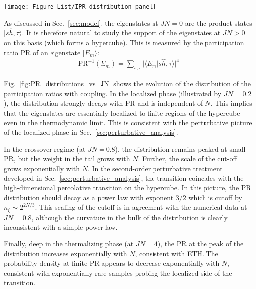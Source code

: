 \documentclass[aps,pra,twocolumn,a4paper,showpacs,superscriptaddress,floatfix,10pt]{revtex4}
\begin{document}
\begin{figure*}[!t]
\texttt{[image: Figure\_List/IPR\_distribution\_panel]}
\caption{Probability density function of the eigenstate participation ratio (PR)
on the classical basis $|s\hat h,\tau\rangle$ for $JN$ in the three different regimes:
deep in the MBL phase ($JN=0.2$), in the crossover region ($JN=0.8$), and
in the thermal phase ($JN=4.0$).
 }
\label{fig:PR_distributions_vs_JN}
\end{figure*}


As discussed in Sec.~\ref{sec:model}, the eigenstates at $JN=0$ are the product states $|s\hat{h}, \tau\rangle$.
It is therefore natural to study the support of the eigenstates at $JN>0$ on this basis (which forms a hypercube).
This is measured by the participation ratio $\textrm{PR}$ of an eigenstate $|E_m\rangle$:
\begin{align}
	\textrm{PR}^{-1}(E_m) = \sum_{s,\tau} |\langle E_m | {s\hat{h},\tau}\rangle |^4
	\label{Eq:ClassicalPR}
\end{align}

Fig.~\ref{fig:PR_distributions_vs_JN} shows the evolution of the distribution of the participation ratios with coupling.
In the localized phase (illustrated by $JN=0.2$), the distribution strongly decays with PR and is independent of $N$.
This implies that the eigenstates are essentially localized to finite regions of the hypercube even in the thermodynamic limit.
This is consistent with the perturbative picture of the localized phase in Sec.~\ref{sec:perturbative_analysis}.

In the crossover regime (at $JN=0.8$), the distribution remains peaked at small PR, but the weight in the tail grows with $N$.
Further, the scale of the cut-off grows exponentially with $N$.
In the second-order perturbative treatment developed in Sec.~\ref{sec:perturbative_analysis}, the transition coincides with the high-dimensional percolative transition on the hypercube.
In this picture, the PR distribution should decay as a power law with exponent $3/2$ which is cutoff by $n_\xi \sim 2^{2N/3}$.
This scaling of the cutoff is in agreement with the numerical data at $JN=0.8$, although the curvature in the bulk of the distribution is clearly inconsistent with a simple power law.

Finally, deep in the thermalizing phase (at $JN=4$), the PR at the peak of the distribution increases exponentially with $N$, consistent with ETH.
The probability density at finite PR appears to decrease exponentially with $N$, consistent with exponentially rare samples probing the localized side of the transition.
\end{document}
